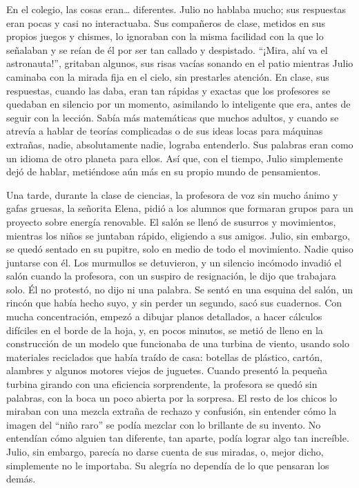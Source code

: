 \documentclass[a4paper,12pt]{book}
\begin{document}
En el colegio, las cosas eran… diferentes. Julio no hablaba mucho; sus respuestas eran pocas y casi no interactuaba. Sus compañeros de clase, metidos en sus propios juegos y chismes, lo ignoraban con la misma facilidad con la que lo señalaban y se reían de él por ser tan callado y despistado. “¡Mira, ahí va el astronauta!”, gritaban algunos, sus risas vacías sonando en el patio mientras Julio caminaba con la mirada fija en el cielo, sin prestarles atención. En clase, sus respuestas, cuando las daba, eran tan rápidas y exactas que los profesores se quedaban en silencio por un momento, asimilando lo inteligente que era, antes de seguir con la lección. Sabía más matemáticas que muchos adultos, y cuando se atrevía a hablar de teorías complicadas o de sus ideas locas para máquinas extrañas, nadie, absolutamente nadie, lograba entenderlo. Sus palabras eran como un idioma de otro planeta para ellos. Así que, con el tiempo, Julio simplemente dejó de hablar, metiéndose aún más en su propio mundo de pensamientos.

Una tarde, durante la clase de ciencias, la profesora de voz sin mucho ánimo y gafas gruesas, la señorita Elena, pidió a los alumnos que formaran grupos para un proyecto sobre energía renovable. El salón se llenó de susurros y movimientos, mientras los niños se juntaban rápido, eligiendo a sus amigos. Julio, sin embargo, se quedó sentado en su pupitre, solo en medio de todo el movimiento. Nadie quiso juntarse con él. Los murmullos se detuvieron, y un silencio incómodo invadió el salón cuando la profesora, con un suspiro de resignación, le dijo que trabajara solo. Él no protestó, no dijo ni una palabra. Se sentó en una esquina del salón, un rincón que había hecho suyo, y sin perder un segundo, sacó sus cuadernos. Con mucha concentración, empezó a dibujar planos detallados, a hacer cálculos difíciles en el borde de la hoja, y, en pocos minutos, se metió de lleno en la construcción de un modelo que funcionaba de una turbina de viento, usando solo materiales reciclados que había traído de casa: botellas de plástico, cartón, alambres y algunos motores viejos de juguetes. Cuando presentó la pequeña turbina girando con una eficiencia sorprendente, la profesora se quedó sin palabras, con la boca un poco abierta por la sorpresa. El resto de los chicos lo miraban con una mezcla extraña de rechazo y confusión, sin entender cómo la imagen del “niño raro” se podía mezclar con lo brillante de su invento. No entendían cómo alguien tan diferente, tan aparte, podía lograr algo tan increíble. Julio, sin embargo, parecía no darse cuenta de sus miradas, o, mejor dicho, simplemente no le importaba. Su alegría no dependía de lo que pensaran los demás.
\end{document}

